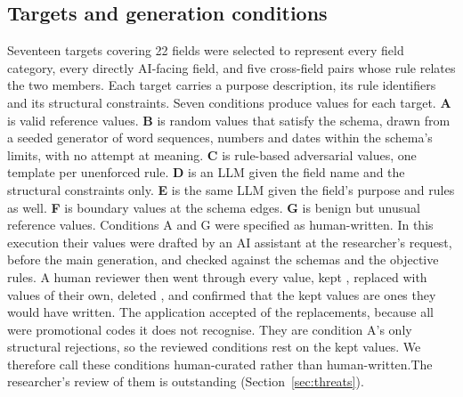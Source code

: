 \documentclass[conference]{IEEEtran}
\begin{document}
\subsection{Targets and generation conditions}
Seventeen targets covering 22 fields were selected to represent every field category, every directly
AI-facing field, and five cross-field pairs whose rule relates the two members. Each target carries a
purpose description, its rule identifiers and its structural constraints. Seven conditions produce
values for each target. \textbf{A} is valid reference values. \textbf{B} is random values that satisfy
the schema, drawn from a seeded generator of word sequences, numbers and dates within the schema's
limits, with no attempt at meaning. \textbf{C} is rule-based adversarial values, one template per
unenforced rule. \textbf{D} is an LLM given the field name and the structural constraints only.
\textbf{E} is the same LLM given the field's purpose and rules as well. \textbf{F} is boundary values
at the schema edges. \textbf{G} is benign but unusual reference values. Conditions A and G were
specified as human-written. In this execution their  values were drafted by an AI
assistant at the researcher's request, before the main generation, and checked against the schemas and
the objective rules. \ifreviewed A human reviewer then went through every value, kept ,
replaced  with values of their own, deleted , and confirmed that the
kept values are ones they would have written. The application accepted  of the
replacements, because all  were promotional codes it does not recognise. They are
condition A's only structural rejections, so the reviewed conditions rest on the kept values. We therefore call these
conditions human-curated rather than human-written.\else The researcher's review of them is outstanding
(Section~\ref{sec:threats}).\fi
\end{document}
